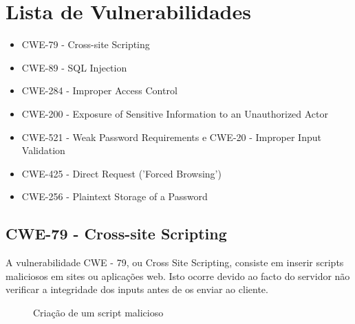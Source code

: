 \documentclass[12pt]{report}
\begin{document}
\chapter{Lista de Vulnerabilidades}\label{Vulnerabilidades}
\begin{itemize}
  \item[\ref{79}] CWE-79 - Cross-site Scripting
  \item[\ref{89}] CWE-89 - SQL Injection
  \item[\ref{284}] CWE-284 - Improper Access Control
  \item[\ref{200}] CWE-200 - Exposure of Sensitive Information to an Unauthorized Actor
  \item[\ref{521}] CWE-521 - Weak Password Requirements e CWE-20 - Improper Input Validation
  \item[\ref{425}] CWE-425 - Direct Request ('Forced Browsing')
  \item[\ref{256}] CWE-256 - Plaintext Storage of a Password
\end{itemize}

\newpage
\section{CWE-79 - Cross-site Scripting} \label{79}
A vulnerabilidade  CWE - 79, ou Cross Site Scripting, consiste em inserir scripts maliciosos em sites ou aplicações web. Isto ocorre devido ao facto do servidor não verificar a integridade dos inputs antes de os enviar ao cliente.\par

\begin{figure}[H]{
\centering
{
\caption{Criação de um script malicioso}
}
}\end{figure}
\end{document}
